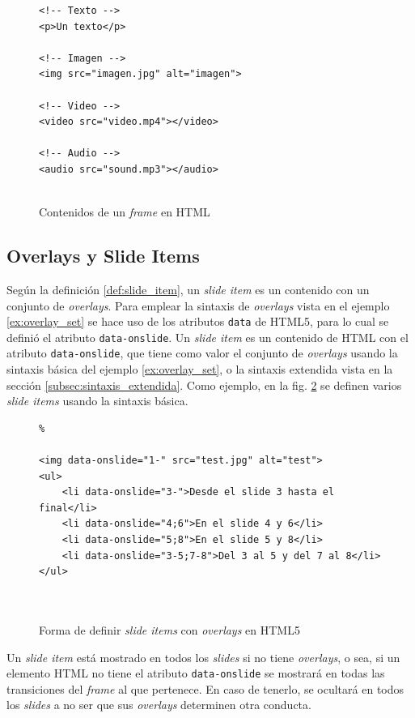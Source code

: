 				\begin{figure}[htb]%

					\begin{lstlisting}						
<!-- Texto -->
<p>Un texto</p>

<!-- Imagen -->
<img src="imagen.jpg" alt="imagen">

<!-- Video -->
<video src="video.mp4"></video>

<!-- Audio -->
<audio src="sound.mp3"></audio>		 							 					
 					 			

					\end{lstlisting}
					\caption{Contenidos de un \textit{frame} en HTML}
					\label{fig:frames_html_content}
				\end{figure}	  
		


		\subsection{Overlays y Slide Items} %
		\label{sub:slide_items}
			Según la definición \ref{def:slide_item}, un \textit{slide item} es un contenido con un conjunto de \textit{overlays}. Para emplear la sintaxis de \textit{overlays} vista en el ejemplo \ref{ex:overlay_set} se hace uso de los atributos \texttt{data} de HTML5, para lo cual se definió el atributo \texttt{data-onslide}. Un \textit{slide item} es un contenido de HTML con el atributo \texttt{data-onslide}, que tiene como valor el conjunto de \textit{overlays} usando la sintaxis básica del ejemplo \ref{ex:overlay_set}, o la sintaxis extendida vista en la sección \ref{subsec:sintaxis_extendida}. Como ejemplo, en la fig. \ref{fig:slide_items_html} se definen varios \textit{slide items} usando la sintaxis básica.


				\begin{figure}[htb]%
					\begin{lstlisting}%

<img data-onslide="1-" src="test.jpg" alt="test">
<ul>
    <li data-onslide="3-">Desde el slide 3 hasta el final</li>
    <li data-onslide="4;6">En el slide 4 y 6</li>
    <li data-onslide="5;8">En el slide 5 y 8</li>
    <li data-onslide="3-5;7-8">Del 3 al 5 y del 7 al 8</li>
</ul> 

	
					\end{lstlisting}
					\caption{Forma de definir \textit{slide items} con \textit{overlays} en HTML5}
					\label{fig:slide_items_html}
				\end{figure}
			Un \textit{slide item} está mostrado en todos los \textit{slides} si no tiene \textit{overlays}, o sea, si un elemento HTML no tiene el atributo \texttt{data-onslide} se mostrará en todas las transiciones del \textit{frame} al que pertenece. En caso de tenerlo, se ocultará en todos los \textit{slides} a no ser que sus \textit{overlays} determinen otra conducta.



